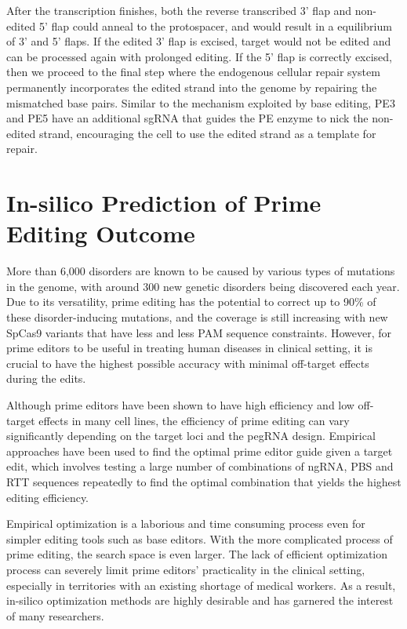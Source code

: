 After the transcription finishes, both the reverse transcribed 3' flap and non-edited 5' flap could anneal to the protospacer, and would result in a equilibrium of 3' and 5' flaps. If the edited 3' flap is excised, target would not be edited and can be processed again with prolonged editing. If the 5' flap is correctly excised, then we proceed to the final step where the endogenous cellular repair system permanently incorporates the edited strand into the genome by repairing the mismatched base pairs. Similar to the mechanism exploited by base editing, PE3 and PE5 have an additional sgRNA that guides the PE enzyme to nick the non-edited strand, encouraging the cell to use the edited strand as a template for repair\cite{liudavidr.SearchandreplaceGenomeEditing2019}.

\section{In-silico Prediction of Prime Editing Outcome}

\label{sec:motivation}

More than 6,000 disorders are known to be caused by various types of mutations in the genome, with around 300 new genetic disorders being discovered each year\cite{petraityteGenomeEditingMedicine2021}. Due to its versatility, prime editing has the potential to correct up to 90\% of these disorder-inducing mutations\cite{kantorCRISPRCas9DNABaseEditing2020}, and the coverage is still increasing with new SpCas9 variants that have less and less PAM sequence constraints\cite{waltonUnconstrainedGenomeTargeting2020}. However, for prime editors to be useful in treating human diseases in clinical setting, it is crucial to have the highest possible accuracy with minimal off-target effects during the edits. 

Although prime editors have been shown to have high efficiency and low off-target effects in many cell lines, the efficiency of prime editing can vary significantly depending on the target loci and the pegRNA design\cite{liudavidr.SearchandreplaceGenomeEditing2019}. Empirical approaches have been used to find the optimal prime editor guide given a target edit, which involves testing a large number of combinations of ngRNA, PBS and RTT sequences repeatedly to find the optimal combination that yields the highest editing efficiency.

Empirical optimization is a laborious and time consuming process even for simpler editing tools such as base editors. With the more complicated process of prime editing, the search space is even larger. The lack of efficient optimization process can severely limit prime editors' practicality in the clinical setting, especially in territories with an existing shortage of medical workers. As a result, in-silico optimization methods are highly desirable and has garnered the interest of many researchers. 

